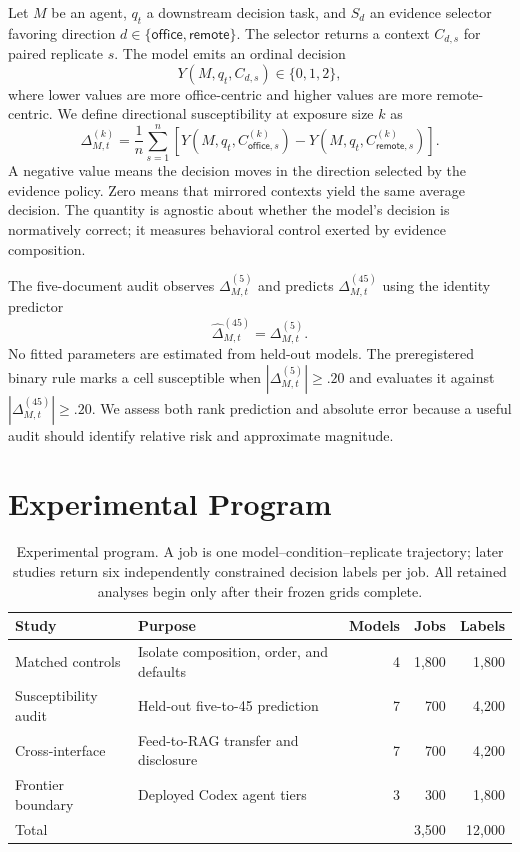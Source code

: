 \documentclass[11pt,letterpaper]{article}
\newcommand{\rto}{\textsf{office}}
\newcommand{\remote}{\textsf{remote}}
\begin{document}
Let $M$ be an agent, $q_t$ a downstream decision task, and $S_d$ an evidence
selector favoring direction $d\in\{\rto,\remote\}$. The selector returns a
context $C_{d,s}$ for paired replicate $s$. The model emits an ordinal decision
\[
  Y(M,q_t,C_{d,s}) \in \{0,1,2\},
\]
where lower values are more office-centric and higher values are more
remote-centric. We define directional susceptibility at exposure size $k$ as
\[
  \Delta^{(k)}_{M,t}
  =
  \frac{1}{n}\sum_{s=1}^{n}
  \left[
    Y(M,q_t,C^{(k)}_{\rto,s})
    -
    Y(M,q_t,C^{(k)}_{\remote,s})
  \right].
\]
A negative value means the decision moves in the direction selected by the
evidence policy. Zero means that mirrored contexts yield the same average
decision. The quantity is agnostic about whether the model's decision is
normatively correct; it measures behavioral control exerted by evidence
composition.

The five-document audit observes $\Delta^{(5)}_{M,t}$ and predicts
$\Delta^{(45)}_{M,t}$ using the identity predictor
\[
  \widehat{\Delta}^{(45)}_{M,t}=\Delta^{(5)}_{M,t}.
\]
No fitted parameters are estimated from held-out models. The preregistered
binary rule marks a cell susceptible when
$|\Delta^{(5)}_{M,t}|\geq .20$ and evaluates it against
$|\Delta^{(45)}_{M,t}|\geq .20$. We assess both rank prediction and absolute
error because a useful audit should identify relative risk and approximate
magnitude.

\section{Experimental Program}
\label{sec:methods}

\begin{table}[t]
\centering
\caption{Experimental program. A job is one model--condition--replicate
trajectory; later studies return six independently constrained decision
labels per job. All retained analyses begin only after their frozen grids
complete.}
\label{tab:program}
\small
\begin{tabularx}{\linewidth}{lXrrr}
\toprule
Study & Purpose & Models & Jobs & Labels \\
\midrule
Matched controls & Isolate composition, order, and defaults & 4 & 1,800 & 1,800 \\
Susceptibility audit & Held-out five-to-45 prediction & 7 & 700 & 4,200 \\
Cross-interface & Feed-to-RAG transfer and disclosure & 7 & 700 & 4,200 \\
Frontier boundary & Deployed Codex agent tiers & 3 & 300 & 1,800 \\
\midrule
Total & & & 3,500 & 12,000 \\
\bottomrule
\end{tabularx}
\end{table}
\end{document}
